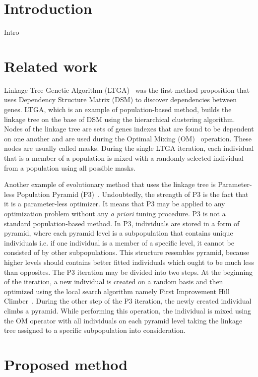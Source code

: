 \section{Introduction}

Intro

\section{Related work}

Linkage Tree Genetic Algorithm (LTGA)~\cite{ltga,ltgaOriginal} was the first method proposition that uses Dependency Structure Matrix (DSM) to discover dependencies between genes. LTGA, which is an example of population-based method, builds the linkage tree on the base of DSM using the hierarchical clustering algorithm. Nodes of the linkage tree are sets of genes indexes that are found to be dependent on one another and are used during the Optimal Mixing (OM)~\cite{om} operation. These nodes are usually called masks. During the single LTGA iteration, each individual that is a member of a population is mixed with a randomly selected individual from a population using all possible masks.

Another example of evolutionary method that uses the linkage tree is Parameter-less Population Pyramid (P3)~\cite{p3,p3Add,p3Runtime}. Undoubtedly, the strength of P3 is the fact that it is a parameter-less optimizer. It means that P3 may be applied to any optimization problem without any \textit{a priori} tuning procedure. P3 is not a standard population-based method. In P3, individuals are stored in a form of pyramid, where each pyramid level is a subpopulation that contains unique individuals i.e. if one individual is a member of a specific level, it cannot be consisted of by other subpopulations. This structure resembles pyramid, because higher levels should contains better fitted individuals which ought to be much less than opposites. The P3 iteration may be divided into two steps. At the beginning of the iteration, a new individual is created on a random basis and then optimized using the local search algorithm namely First Improvement Hill Climber~\cite{p3}. During the other step of the P3 iteration, the newly created individual climbs a pyramid. While performing this operation, the individual is mixed using the OM operator with all individuals on each pyramid level taking the linkage tree assigned to a specific subpopulation into consideration. 

\section{Proposed method}

